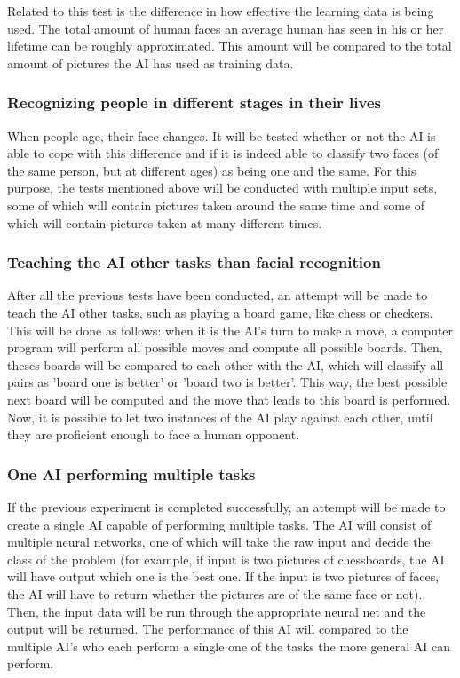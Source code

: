 \documentclass[12pt, titlepage]{article}
\begin{document}
		\bigskip
		Related to this test is the difference in how effective the learning data is being used. The total amount of human faces an average human has seen in his or her lifetime can be roughly approximated. This amount will be compared to the total amount of pictures the AI has used as training data.
		
		\subsubsection{Recognizing people in different stages in their lives}
		When people age, their face changes. It will be tested whether or not the AI is able to cope with this difference and if it is indeed able to classify two faces (of the same person, but at different ages) as being one and the same. For this purpose, the tests mentioned above will be conducted with multiple input sets, some of which will contain pictures taken around the same time and some of which will contain pictures taken at many different times.
		
		\subsubsection{Teaching the AI other tasks than facial recognition}
		After all the previous tests have been conducted, an attempt will be made to teach the AI other tasks, such as playing a board game, like chess or checkers. This will be done as follows: when it is the AI's turn to make a move, a computer program will perform all possible moves and compute all possible boards. Then, theses boards will be compared to each other with the AI, which will classify all pairs as 'board one is better' or 'board two is better'. This way, the best possible next board will be computed and the move that leads to this board is performed. Now, it is possible to let two instances of the AI play against each other, until they are proficient enough to face a human opponent.
		
		\subsubsection{One AI performing multiple tasks}
		If the previous experiment is completed successfully, an attempt will be made to create a single AI capable of performing multiple tasks. The AI will consist of multiple neural networks, one of which will take the raw input and decide the class of the problem (for example, if input is two pictures of chessboards, the AI will have output which one is the best one. If the input is two pictures of faces, the AI will have to return whether the pictures are of the same face or not). Then, the input data will be run through the appropriate neural net and the output will be returned. The performance of this AI will compared to the multiple AI's who each perform a single one of the tasks the more general AI can perform.
		
\end{document}
